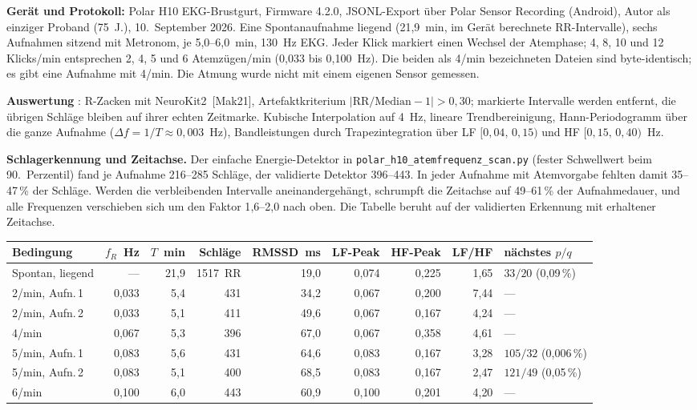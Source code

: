 \textbf{Gerät und Protokoll:} Polar H10 EKG-Brustgurt, Firmware 4.2.0,
JSONL-Export über Polar Sensor Recording (Android), Autor als einziger
Proband (75~J.), 10.~September 2026. Eine Spontanaufnahme liegend
(21{,}9~min, im Gerät berechnete RR-Intervalle), sechs Aufnahmen sitzend
mit Metronom, je 5{,}0--6{,}0~min, 130~Hz EKG. Jeder Klick markiert einen
Wechsel der Atemphase; 4, 8, 10 und 12 Klicks/min entsprechen 2, 4, 5 und
6 Atemzügen/min (0{,}033 bis 0{,}100~Hz). Die beiden als 4/min
bezeichneten Dateien sind byte-identisch; es gibt eine Aufnahme mit
4/min. Die Atmung wurde nicht mit einem eigenen Sensor gemessen.

\textbf{Auswertung} \KM: R-Zacken mit NeuroKit2 \LM\,[Mak21],
Artefaktkriterium $|\text{RR}/\text{Median}-1|>0{,}30$; markierte
Intervalle werden entfernt, die übrigen Schläge bleiben auf ihrer echten
Zeitmarke. Kubische Interpolation auf 4~Hz, lineare Trendbereinigung,
Hann-Periodogramm über die ganze Aufnahme ($\Delta f=1/T\approx0{,}003$~Hz),
Bandleistungen durch Trapezintegration über LF $[0{,}04,\,0{,}15)$ und
HF $[0{,}15,\,0{,}40)$~Hz.

\textbf{Schlagerkennung und Zeitachse.} Der einfache Energie-Detektor in
\texttt{polar\_h10\_atemfrequenz\_scan.py} (fester Schwellwert beim
90.~Perzentil) fand je Aufnahme 216--285 Schläge, der validierte Detektor
396--443. In jeder Aufnahme mit Atemvorgabe fehlten damit 35--47\,\% der
Schläge. Werden die verbleibenden Intervalle aneinandergehängt, schrumpft
die Zeitachse auf 49--61\,\% der Aufnahmedauer, und alle Frequenzen
verschieben sich um den Faktor 1{,}6--2{,}0 nach oben. Die Tabelle beruht
auf der validierten Erkennung mit erhaltener Zeitachse.

\begin{center}
\small
\begin{tabular}{@{}lrrrrrrrl@{}}
\toprule
Bedingung & $f_R$~Hz & $T$~min & Schläge & RMSSD~ms & LF-Peak & HF-Peak & LF/HF & nächstes $p/q$ \\
\midrule
Spontan, liegend & --- & 21{,}9 & 1517~RR & 19{,}0 & 0{,}074 & 0{,}225 & 1{,}65 & $33/20$ (0{,}09\,\%) \\
2/min, Aufn.\,1 & 0{,}033 & 5{,}4 & 431 & 34{,}2 & 0{,}067 & 0{,}200 & 7{,}44 & --- \\
2/min, Aufn.\,2 & 0{,}033 & 5{,}1 & 411 & 49{,}6 & 0{,}067 & 0{,}167 & 4{,}24 & --- \\
4/min & 0{,}067 & 5{,}3 & 396 & 67{,}0 & 0{,}067 & 0{,}358 & 4{,}61 & --- \\
5/min, Aufn.\,1 & 0{,}083 & 5{,}6 & 431 & 64{,}6 & 0{,}083 & 0{,}167 & 3{,}28 & $105/32$ (0{,}006\,\%) \\
5/min, Aufn.\,2 & 0{,}083 & 5{,}1 & 400 & 68{,}5 & 0{,}083 & 0{,}167 & 2{,}47 & $121/49$ (0{,}05\,\%) \\
6/min & 0{,}100 & 6{,}0 & 443 & 60{,}9 & 0{,}100 & 0{,}201 & 4{,}20 & --- \\
\bottomrule
\end{tabular}
\end{center}

